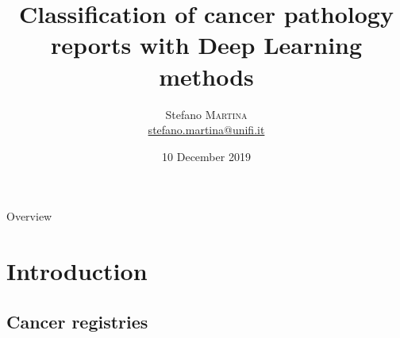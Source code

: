 






\title[]{\textbf{Classification of cancer pathology reports with Deep
  Learning methods}}
\date[10 December 2019]{10 December 2019}

\author[Stefano Martina]{
  \begin{center}
    \begin{tabular}{lr}
      Stefano \textsc{Martina}\\
      \href{mailto:stefano.martina@unifi.it}{stefano.martina@unifi.it}\\
    \end{tabular}
  \end{center}
}




\begin{frame}[plain]
  \titlepage
\end{frame}

\begin{frame}{Overview}
  \tableofcontents
\end{frame}

\section{Introduction}

\subsection{Cancer registries}

